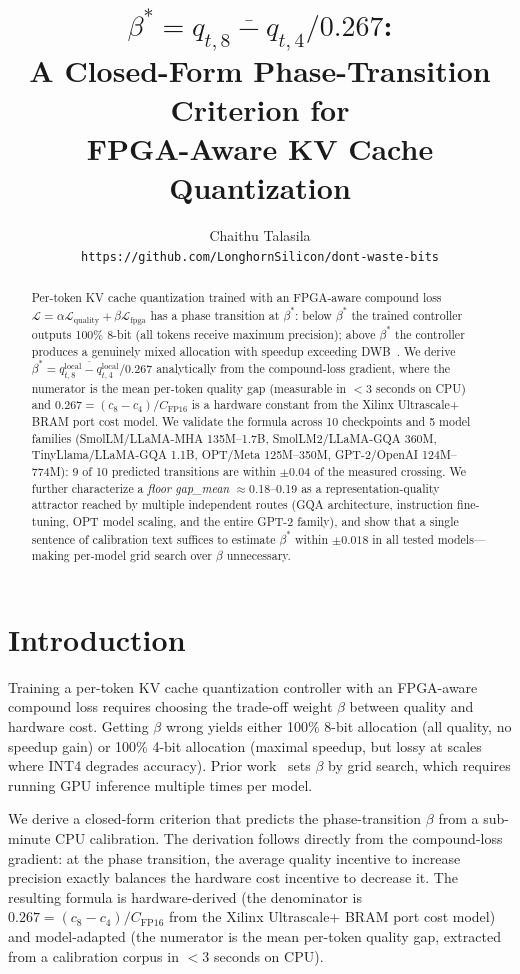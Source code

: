 \documentclass{article}
\title{\textbf{$\beta^* = \overline{q_{t,8} - q_{t,4}} / 0.267$:\\
A Closed-Form Phase-Transition Criterion for\\
FPGA-Aware KV Cache Quantization}}
\author{
  Chaithu Talasila\\
  \texttt{https://github.com/LonghornSilicon/dont-waste-bits}
}
\date{}
\begin{document}
\maketitle

\begin{abstract}
Per-token KV cache quantization trained with an FPGA-aware compound loss
$\mathcal{L} = \alpha\mathcal{L}_\text{quality} + \beta\mathcal{L}_\text{fpga}$ has a
phase transition at $\beta^*$: below $\beta^*$ the trained controller outputs 100\% 8-bit
(all tokens receive maximum precision); above $\beta^*$ the controller produces a
genuinely mixed allocation with speedup exceeding DWB~\citep{haeri2026dwb}.
We derive $\beta^* = \overline{q_{t,8}^\text{local} - q_{t,4}^\text{local}} / 0.267$
analytically from the compound-loss gradient, where the numerator is the mean
per-token quality gap (measurable in $<$3 seconds on CPU) and $0.267 = (c_8 - c_4)/C_\text{FP16}$
is a hardware constant from the Xilinx Ultrascale+ BRAM port cost model.
We validate the formula across 10 checkpoints and 5 model families
(SmolLM/LLaMA-MHA 135M--1.7B, SmolLM2/LLaMA-GQA 360M, TinyLlama/LLaMA-GQA 1.1B,
OPT/Meta 125M--350M, GPT-2/OpenAI 124M--774M): 9 of 10 predicted transitions
are within $\pm 0.04$ of the measured crossing.
We further characterize a \emph{floor gap\_mean} $\approx$0.18--0.19 as a
representation-quality attractor reached by multiple independent routes (GQA architecture,
instruction fine-tuning, OPT model scaling, and the entire GPT-2 family), and show that
a single sentence of calibration text suffices to estimate $\beta^*$ within $\pm 0.018$
in all tested models---making per-model grid search over $\beta$ unnecessary.
\end{abstract}

\section{Introduction}
\label{sec:intro}

Training a per-token KV cache quantization controller with an FPGA-aware compound loss
requires choosing the trade-off weight $\beta$ between quality and hardware cost.
Getting $\beta$ wrong yields either 100\% 8-bit allocation (all quality, no speedup gain)
or 100\% 4-bit allocation (maximal speedup, but lossy at scales where INT4 degrades accuracy).
Prior work~\citep{haeri2026dwb} sets $\beta$ by grid search, which requires running GPU
inference multiple times per model.

We derive a closed-form criterion that predicts the phase-transition $\beta$ from
a sub-minute CPU calibration. The derivation follows directly from the compound-loss gradient:
at the phase transition, the average quality incentive to increase precision exactly balances
the hardware cost incentive to decrease it. The resulting formula is hardware-derived (the
denominator is $0.267 = (c_8 - c_4) / C_\text{FP16}$ from the Xilinx Ultrascale+ BRAM port
cost model) and model-adapted (the numerator is the mean per-token quality gap, extracted
from a calibration corpus in $<$3 seconds on CPU).
\end{document}

